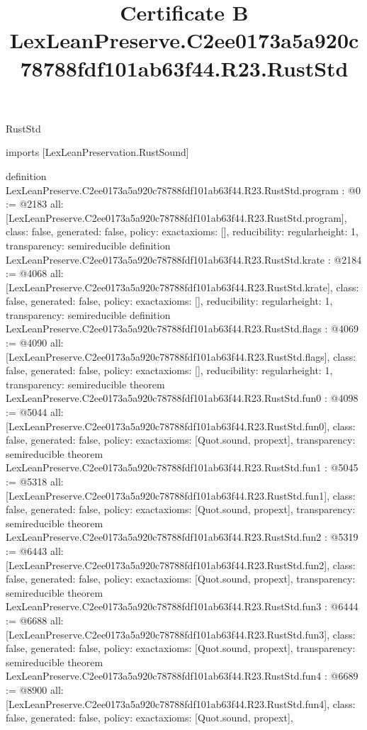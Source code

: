 \begin{lexlean}{RustStd}
\title{Certificate B LexLeanPreserve.C2ee0173a5a920c78788fdf101ab63f44.R23.RustStd}
\begin{coremodule}
imports [LexLeanPreservation.RustSound]

definition LexLeanPreserve.C2ee0173a5a920c78788fdf101ab63f44.R23.RustStd.program : @0 := @2183 {
  all: [LexLeanPreserve.C2ee0173a5a920c78788fdf101ab63f44.R23.RustStd.program],
  class: false,
  generated: false,
  policy: exact{axioms: []},
  reducibility: regular{height: 1},
  transparency: semireducible
}
definition LexLeanPreserve.C2ee0173a5a920c78788fdf101ab63f44.R23.RustStd.krate : @2184 := @4068 {
  all: [LexLeanPreserve.C2ee0173a5a920c78788fdf101ab63f44.R23.RustStd.krate],
  class: false,
  generated: false,
  policy: exact{axioms: []},
  reducibility: regular{height: 1},
  transparency: semireducible
}
definition LexLeanPreserve.C2ee0173a5a920c78788fdf101ab63f44.R23.RustStd.flags : @4069 := @4090 {
  all: [LexLeanPreserve.C2ee0173a5a920c78788fdf101ab63f44.R23.RustStd.flags],
  class: false,
  generated: false,
  policy: exact{axioms: []},
  reducibility: regular{height: 1},
  transparency: semireducible
}
theorem LexLeanPreserve.C2ee0173a5a920c78788fdf101ab63f44.R23.RustStd.fun0 : @4098 := @5044 {
  all: [LexLeanPreserve.C2ee0173a5a920c78788fdf101ab63f44.R23.RustStd.fun0],
  class: false,
  generated: false,
  policy: exact{axioms: [Quot.sound, propext]},
  transparency: semireducible
}
theorem LexLeanPreserve.C2ee0173a5a920c78788fdf101ab63f44.R23.RustStd.fun1 : @5045 := @5318 {
  all: [LexLeanPreserve.C2ee0173a5a920c78788fdf101ab63f44.R23.RustStd.fun1],
  class: false,
  generated: false,
  policy: exact{axioms: [Quot.sound, propext]},
  transparency: semireducible
}
theorem LexLeanPreserve.C2ee0173a5a920c78788fdf101ab63f44.R23.RustStd.fun2 : @5319 := @6443 {
  all: [LexLeanPreserve.C2ee0173a5a920c78788fdf101ab63f44.R23.RustStd.fun2],
  class: false,
  generated: false,
  policy: exact{axioms: [Quot.sound, propext]},
  transparency: semireducible
}
theorem LexLeanPreserve.C2ee0173a5a920c78788fdf101ab63f44.R23.RustStd.fun3 : @6444 := @6688 {
  all: [LexLeanPreserve.C2ee0173a5a920c78788fdf101ab63f44.R23.RustStd.fun3],
  class: false,
  generated: false,
  policy: exact{axioms: [Quot.sound, propext]},
  transparency: semireducible
}
theorem LexLeanPreserve.C2ee0173a5a920c78788fdf101ab63f44.R23.RustStd.fun4 : @6689 := @8900 {
  all: [LexLeanPreserve.C2ee0173a5a920c78788fdf101ab63f44.R23.RustStd.fun4],
  class: false,
  generated: false,
  policy: exact{axioms: [Quot.sound, propext]},
}
\end{coremodule}
\end{lexlean}
